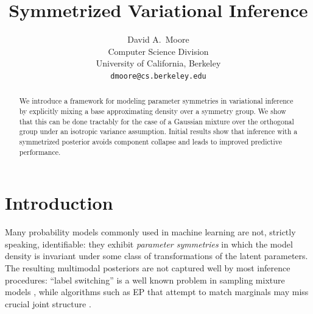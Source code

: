 \documentclass{article}
\title{Symmetrized Variational Inference}
\author{
  David A.~Moore\\
  Computer Science Division\\
  University of California, Berkeley\\
  \texttt{dmoore@cs.berkeley.edu} \\
}
\begin{document}

\maketitle

\begin{abstract}
We introduce a framework for modeling parameter symmetries in
variational inference by explicitly mixing a base approximating density over a
symmetry group. We show that this can
be done tractably for the case of a Gaussian mixture over the
orthogonal group under an isotropic variance assumption. Initial results show that inference with
a symmetrized posterior avoids component collapse and leads to improved predictive performance. 
\end{abstract}


%
%
%
%
%
%
%
\section{Introduction}

Many probability models commonly used in machine learning are not,
strictly speaking, identifiable: they exhibit {\em parameter
  symmetries} in which the model density is invariant under some class
of transformations of the latent parameters. The resulting multimodal posteriors
are not captured well by most inference procedures: ``label
switching'' is a well known problem in sampling mixture models \citep{neal1999erroneous,
  celeux2000computational}, while algorithms such as EP
that attempt to match marginals may miss crucial joint structure \citep{nishihara2013detecting}. 
\end{document}
